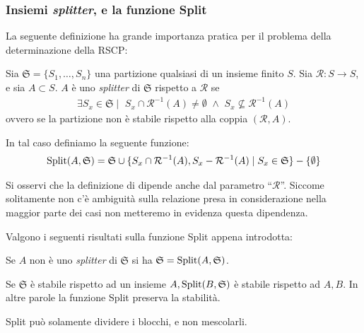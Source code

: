 \subsubsection{Insiemi \emph{splitter}, e la funzione Split}
La seguente definizione ha grande importanza pratica per il problema della determinazione della RSCP:
\begin{definition}
    \label{def:funz_split}
    Sia $\mathfrak{S} = \{S_1,\dots,S_n\}$ una partizione qualsiasi di un insieme finito $S$. Sia $\mathcal{R}: S \to S$, e sia $A \subset S$. $A$ è uno \emph{splitter} di $\mathfrak{S}$ rispetto a $\mathcal{R}$ se
    \begin{gather*}
        \exists S_x \in \mathfrak{S} \mid \,\, S_x \cap \mathcal{R}^{-1}(A) \neq \emptyset \,\,\land\,\, S_x \not\subseteq \mathcal{R}^{-1}(A)
    \end{gather*}
    ovvero se la partizione non è stabile rispetto alla coppia $(\mathcal{R},A)$.

    In tal caso definiamo la seguente funzione:
    \begin{gather*}
        \textup{Split}(A,\mathfrak{S}) = \mathfrak{S} \cup \{S_x \cap \mathcal{R}^{-1}(A), S_x - \mathcal{R}^{-1}(A) \mid S_x \in \mathfrak{S}\} - \{\emptyset\}
    \end{gather*}

    Si osservi che la definizione di \splitfunc dipende anche dal parametro ``$\mathcal{R}$''. Siccome solitamente non c'è ambiguità sulla relazione presa in considerazione nella maggior parte dei casi non metteremo in evidenza questa dipendenza.
\end{definition}

Valgono i seguenti risultati sulla funzione Split appena introdotta:
\begin{observation}
    Se $A$ non è uno \emph{splitter} di $\mathfrak{S}$ si ha $\mathfrak{S} = \textup{Split}(A,\mathfrak{S})$.
\end{observation}

\begin{proposition}
    \label{prop:split_eredita}
    Se $\mathfrak{S}$ è stabile rispetto ad un insieme $A, \textup{Split}(B,\mathfrak{S})$ è stabile rispetto ad $A,B$. In altre parole la funzione Split preserva la stabilità.
\end{proposition}
\begin{proof2}
    Split può solamente dividere i blocchi, e non mescolarli.
\end{proof2}

